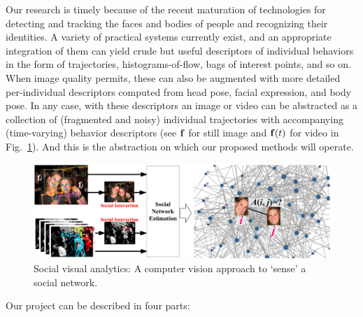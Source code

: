 Our research is timely because of the recent maturation of technologies for detecting and tracking the faces and bodies of people and recognizing their identities. A variety of practical systems currently exist, and an appropriate integration of them can yield crude but useful descriptors of individual behaviors in the form of trajectories, histograms-of-flow, bags of interest points, and so on. When image quality permits, these can also be augmented with more detailed per-individual descriptors computed from head pose, facial expression, and body pose. In any case, with these descriptors an image or video can be abstracted as a collection of (fragmented and noisy) individual trajectories with accompanying (time-varying) behavior descriptors (see ${\bf f}$ for still image and ${\bf f}(t)$ for video in Fig.~\ref{fig:intro}). And this is the abstraction on which our proposed methods will operate.

\begin{figure}[t!]
\begin{center}
\includegraphics[width=\columnwidth]{intro_1}
\end{center}
\vspace{-0.25in} \caption{\captionsize 
Social visual analytics: A computer vision approach to `sense' a social network. \label{fig:intro}\afterfigspace}
\end{figure}

Our project can be described in four parts:

